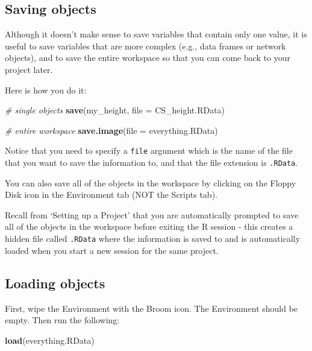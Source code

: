 \documentclass[
]{book}
\newenvironment{Shaded}{\begin{snugshade}}{\end{snugshade}}
\newcommand{\AttributeTok}[1]{\textcolor[rgb]{0.13,0.29,0.53}{#1}}
\newcommand{\CommentTok}[1]{\textcolor[rgb]{0.56,0.35,0.01}{\textit{#1}}}
\newcommand{\FunctionTok}[1]{\textcolor[rgb]{0.13,0.29,0.53}{\textbf{#1}}}
\newcommand{\NormalTok}[1]{#1}
\newcommand{\StringTok}[1]{\textcolor[rgb]{0.31,0.60,0.02}{#1}}
\begin{document}
\subsection{Saving objects}\label{saving-objects}

Although it doesn't make sense to save variables that contain only one value, it is useful to save variables that are more complex (e.g., data frames or network objects), and to save the entire workspace so that you can come back to your project later.

Here is how you do it:

\begin{Shaded}
\begin{Highlighting}[]
\CommentTok{\# single objects }
\FunctionTok{save}\NormalTok{(my\_height, }\AttributeTok{file =} \StringTok{\textquotesingle{}CS\_height.RData\textquotesingle{}}\NormalTok{)}

\CommentTok{\# entire workspace}
\FunctionTok{save.image}\NormalTok{(}\AttributeTok{file =} \StringTok{\textquotesingle{}everything.RData\textquotesingle{}}\NormalTok{)}
\end{Highlighting}
\end{Shaded}

Notice that you need to specify a \texttt{file} argument which is the name of the file that you want to save the information to, and that the file extension is \texttt{.RData}.

You can also save all of the objects in the workspace by clicking on the Floppy Disk icon in the Environment tab (NOT the Scripts tab).

Recall from `Setting up a Project' that you are automatically prompted to save all of the objects in the workspace before exiting the R session - this creates a hidden file called \texttt{.RData} where the information is saved to and is automatically loaded when you start a new session for the same project.

\subsection{Loading objects}\label{loading-objects}

First, wipe the Environment with the Broom icon. The Environment should be empty. Then run the following:

\begin{Shaded}
\begin{Highlighting}[]
\FunctionTok{load}\NormalTok{(}\StringTok{\textquotesingle{}everything.RData\textquotesingle{}}\NormalTok{)}
\end{Highlighting}
\end{Shaded}
\end{document}
